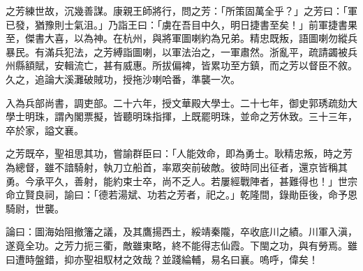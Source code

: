 \begin{pinyinscope}
之芳練世故，沉幾善謀。康親王師將行，問之芳：「所策固萬全乎？」之芳曰：「軍已發，猶豫則士氣沮。」乃詣王曰：「虜在吾目中久，明日捷書至矣！」前軍捷書果至，傑書大喜，以為神。在杭州，與將軍圖喇約為兄弟。精忠既叛，語圖喇勿縱兵暴民。有滿兵犯法，之芳縛詣圖喇，以軍法治之，一軍肅然。浙亂平，疏請蠲被兵州縣額賦，安輯流亡，甚有威惠。所拔偏裨，皆累功至方鎮，而之芳以督臣不敘。久之，追論大溪灘破賊功，授拖沙喇哈番，準襲一次。

入為兵部尚書，調吏部。二十六年，授文華殿大學士。二十七年，御史郭琇疏劾大學士明珠，謂內閣票擬，皆聽明珠指揮，上既罷明珠，並命之芳休致。三十三年，卒於家，謚文襄。

之芳既卒，聖祖思其功，嘗諭群臣曰：「人能效命，即為勇士。耿精忠叛，時之芳為總督，雖不諳騎射，執刀立船首，率眾突前破敵。彼時同出征者，還京皆稱其勇。今承平久，善射，能約束士卒，尚不乏人。若屢經戰陣者，甚難得也！」世宗命立賢良祠，諭曰：「德若湯斌、功若之芳者，祀之。」乾隆間，錄勛臣後，命予恩騎尉，世襲。

論曰：圖海始阻撤籓之議，及其鷹揚西土，綏靖秦隴，卒收底川之績。川軍入滇，遂竟全功。之芳力扼三衢，敵雖東略，終不能得志仙霞。下閩之功，與有勞焉。雖曰遭時盤錯，抑亦聖祖馭材之效哉？並踐綸輔，易名曰襄。嗚呼，偉矣！


\end{pinyinscope}